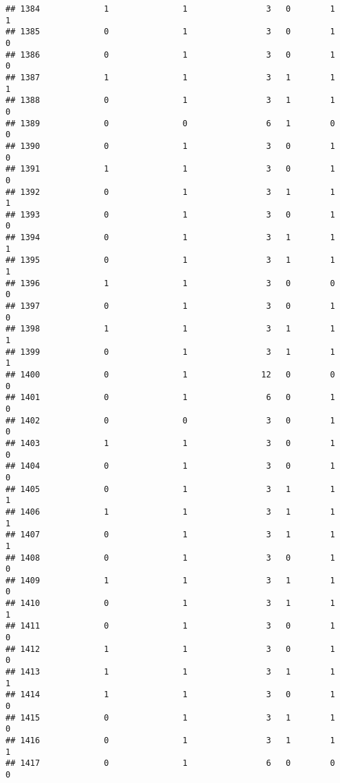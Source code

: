 \documentclass[]{article}
\begin{document}
\begin{verbatim}
## 1384             1               1                3   0        1        1
## 1385             0               1                3   0        1        0
## 1386             0               1                3   0        1        0
## 1387             1               1                3   1        1        1
## 1388             0               1                3   1        1        0
## 1389             0               0                6   1        0        0
## 1390             0               1                3   0        1        0
## 1391             1               1                3   0        1        0
## 1392             0               1                3   1        1        1
## 1393             0               1                3   0        1        0
## 1394             0               1                3   1        1        1
## 1395             0               1                3   1        1        1
## 1396             1               1                3   0        0        0
## 1397             0               1                3   0        1        0
## 1398             1               1                3   1        1        1
## 1399             0               1                3   1        1        1
## 1400             0               1               12   0        0        0
## 1401             0               1                6   0        1        0
## 1402             0               0                3   0        1        0
## 1403             1               1                3   0        1        0
## 1404             0               1                3   0        1        0
## 1405             0               1                3   1        1        1
## 1406             1               1                3   1        1        1
## 1407             0               1                3   1        1        1
## 1408             0               1                3   0        1        0
## 1409             1               1                3   1        1        0
## 1410             0               1                3   1        1        1
## 1411             0               1                3   0        1        0
## 1412             1               1                3   0        1        0
## 1413             1               1                3   1        1        1
## 1414             1               1                3   0        1        0
## 1415             0               1                3   1        1        0
## 1416             0               1                3   1        1        1
## 1417             0               1                6   0        0        0

\end{verbatim}
\end{document}
